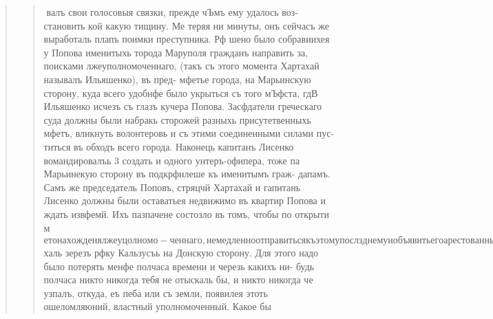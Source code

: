\begin{quote}
\begin{quote}
валъ свои голосовыя связки, прежде чЪмъ ему удалось воз-
становить кой какую тищину. Ме теряя ни минуты, онъ
сейчасъ же выработаль плапъ поимки преступника. Рф шено
было собравиихея у Попова именитыхь торода Маруполя
гражданъ направить за, поисками лжеуполномоченнаго, (такъ
съ этого момента Хартахай называлъ Ильяшенко), въ пред-
мфетье города, на Марьинскую сторону, куда всего удобнфе
было укрыться съ того мЪфста, гдВ Ильяшенко исчезъ съ
глазъ кучера Попова. Засфдатели греческаго суда должны
были набракь сторожей разныхь присутетвенныхь мфетъ,
вликнуть волонтеровь и съ этими соединенными силами пус-
титься въ обходъ всего города. Наконець капитанъ Лисенко
вомандировалъь 3 создать и одного унтеръ-офипера, тоже па
Марьинекую сторону въ подкрфнлеше къ именитымъ граж-
дапамъ. Самъ же председатель Поповъ, стряцчй Хартахай
и гапитань Лисенко должны были оставатьея недвижимо въ
квартир Попова и ждать извфемй. Ихъ пазпачене состозло
въ томъ, чтобы по открыти м$етонахожденя лжеуцолномо-
ченнаго, немедленно отправиться къ этому послзднему и
объявить его арестованнымт. ]

Цоиски имепитыхь гражданъ и соединеннаго отрада,
руководимаго засфдателями были безуспВшны; на воз ихъ
разсироем имъ отвьфчали, что никакой назальвикь нигдф не
проявлялея. Они ошибочно искали чрезвычайныхь зваменй
чрезвычайнато уполномоченнаго въ видф развфвающатося флага
надь домомъ, занимаемомъ этимъ послфднимъ, или въ вид.
полосатой будки съ заключеннымъ въ ней полицейскимъ и
т. п. Но такихь знамен! не дано было имъ открыть. Име-
нитые граждане ходили толпой, горячо разговаривали, спо-
рили и тоже пичего знаменательнаго не открыли. Носланные
же капитаномъ солдатики замЪтили возлВ одной изъ хать
на Марьипской сторонЪ ту самую одноконную повозку, на
м фи рее

которой Ильяшенко и его товарищи наканунф въЪхали въ
г. Мар!уполь. Солдатики уклонились оть сложныхь разсу-
‘жденй и непосредственио рфшили, что эта повозка никого
иного, канъ только начальника, вЪротно въ пользу этого
быстраго заключен!я говорило то обетоятельетво, что мфетное
павелеше не пользовалось одноконными телфгами, а упот-
ребляло двухконныя, похозйя на современные фургоны. Одинъ
солдатикъ, подкравшись, заглянуть въ окно и увидёль че-
ловЪка, растянувшагося на лавьВ; кавъ заглянув въ окно,
такъ и его товарищи опять непосредственно уфшили, что
никому иному не растягиваться на завьВ, какъ только на-
чальнику и побЪжали отрапортовать о своей находеЁ капи-
тану Лисенко.

Впередь каюсь; на одну минуту я измёню своей роли
лВтониеда-протоколиста и не воздержусь отъ упрека, который
мн хочется бросить Ильяшенко. Мн хочется ему сказать:
„Ильяшенко, Ильяшенко, почто ты, ‘нагрузившись достаточно
за обфдомъ у Попова, напилея окончательно пьянъ, придя
домой. Зачфмъ ты, спровадивъ кучера Попова, не запрегъ
своей лошади и вмВетф съ твоими товарищами ве пере$халь
зерезъ рфку Кальзусъь на Донскую сторону. Для этого надо
было потерять менфе полчаса времени и черезь какихъ ни-
будь полчаса никто никогда тебя не отыскаль бы, и никто
никогда че узпалъ, откуда, еъ пеба или съ земли, появилея
этоть ошеломляюний, властный уполномоченный. Какое бы


\end{quote}
\end{quote}
